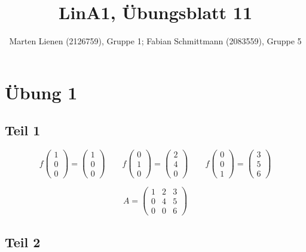 \documentclass[a4paper,10pt]{article}
\title{LinA1, Übungsblatt 11}
\author{Marten Lienen (2126759), Gruppe 1; Fabian Schmittmann (2083559), Gruppe 5}
\begin{document}
\maketitle

\section*{Übung 1}

\subsection*{Teil 1}

\begin{equation}
 f \begin{pmatrix}1\\0\\0\end{pmatrix} = \begin{pmatrix}1\\0\\0\end{pmatrix}
 \qquad f \begin{pmatrix}0\\1\\0\end{pmatrix} = \begin{pmatrix}2\\4\\0\end{pmatrix}
 \qquad f \begin{pmatrix}0\\0\\1\end{pmatrix} = \begin{pmatrix}3\\5\\6\end{pmatrix}
\end{equation}

\begin{equation}
 A = 
  \begin{pmatrix}
   1 & 2 & 3\\
   0 & 4 & 5\\
   0 & 0 & 6
  \end{pmatrix}
\end{equation}

\subsection*{Teil 2}
\end{document}
